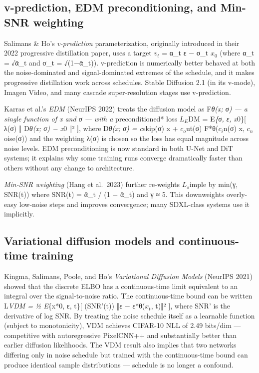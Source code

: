\subsection{v-prediction, EDM preconditioning, and Min-SNR weighting}\label{v-prediction-edm-preconditioning-and-min-snr-weighting}

Salimans \& Ho's \emph{v-prediction} parameterization, originally introduced in their 2022 progressive distillation paper, uses a target \(v_t\) = α\_t ε − σ\_t \(x_0\) (where α\_t = √ᾱ\_t and σ\_t = √(1−ᾱ\_t)). v-prediction is numerically better behaved at both the noise-dominated and signal-dominated extremes of the schedule, and it makes progressive distillation work across schedules. Stable Diffusion 2.1 (in its v-mode), Imagen Video, and many cascade super-resolution stages use v-prediction.

Karras et al.'s \emph{EDM} (NeurIPS 2022) treats the diffusion model as F\emph{θ(x; σ) --- a single function of x and σ --- with a }preconditioned* loss \(L_E\)DM = E\emph{\{σ, ε, x}0\}{[} λ(σ) ‖ D\emph{θ(x; σ) − x}0 ‖² {]}, where D\emph{θ(x; σ) = c}skip(σ) x + \(c_o\)ut(σ) F*θ(\(c_i\)n(σ) x, \(c_n\)oise(σ)) and the weighting λ(σ) is chosen so the loss has equal magnitude across noise levels. EDM preconditioning is now standard in both U-Net and DiT systems; it explains why some training runs converge dramatically faster than others without any change to architecture.

\emph{Min-SNR weighting} (Hang et al.~2023) further re-weights \(L_s\)imple by min(γ, SNR(t)) where SNR(t) = ᾱ\_t / (1 − ᾱ\_t) and γ ≈ 5. This downweights overly-easy low-noise steps and improves convergence; many SDXL-class systems use it implicitly.

\subsection{Variational diffusion models and continuous-time training}\label{variational-diffusion-models-and-continuous-time-training}

Kingma, Salimans, Poole, and Ho's \emph{Variational Diffusion Models} (NeurIPS 2021) showed that the discrete ELBO has a continuous-time limit equivalent to an integral over the signal-to-noise ratio. The continuous-time bound can be written L\emph{VDM = ½ E}\{x*0, ε, t\}{[} (SNR'(t)) ‖ε − ε*θ(\(x_t\), t)‖² {]}, where SNR' is the derivative of log SNR. By treating the noise schedule itself as a learnable function (subject to monotonicity), VDM achieves CIFAR-10 NLL of 2.49 bits/dim --- competitive with autoregressive PixelCNN++ and substantially better than earlier diffusion likelihoods. The VDM result also implies that two networks differing only in noise schedule but trained with the continuous-time bound can produce identical sample distributions --- schedule is no longer a confound.

